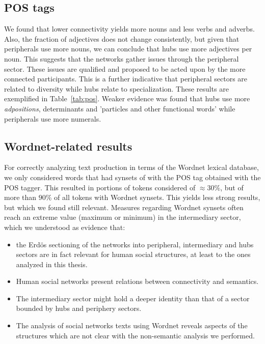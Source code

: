 
\subsection{POS tags}\label{subsec:pos}
We found that lower connectivity yields more nouns and less verbs and adverbs.
Also, the fraction of adjectives does not change consistently,
but given that peripherals use more nouns,
we can conclude that hubs use more adjectives per noun.
This suggests that the networks gather issues
through the peripheral sector. 
These issues are qualified and proposed to be acted upon
by the more connected participants.
This is a further indicative that peripheral sectors
are related to diversity while hubs relate to specialization.
These results are exemplified in Table~\ref{tab:pos}.
Weaker evidence was found that hubs use more \emph{adpositions},
determinants and 'particles and other functional words' while
peripherals use more numerals.

\FloatBarrier


\subsection{Wordnet-related results}
For correctly analyzing text production in terms of the Wordnet lexical database,
we only considered words that had synsets of with the POS tag obtained with the POS tagger.
This resulted in portions of tokens considered of $\approx 30\%$,
but of more than $90\%$ of all tokens with Wordnet synsets.
This yields less strong results, but which we found still relevant.
Measures regarding Wordnet synsets often reach an extreme value (maximum or minimum)
in the intermediary sector, which we understood as evidence that:
\begin{itemize}
\item the Erd\"os sectioning of the networks into peripheral, intermediary and hubs sectors are in fact relevant for human social structures, at least to the ones analyzed in this thesis.
\item Human social networks present relations between connectivity and semantics.
\item The intermediary sector might hold a deeper identity than that of a sector bounded by hubs and periphery sectors.
\item The analysis of social networks texts using Wordnet reveals aspects of the structures which are not clear with the non-semantic analysis we performed.
\end{itemize}

